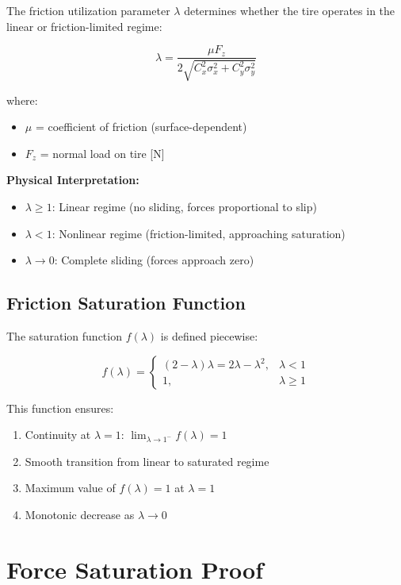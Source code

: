 \documentclass[11pt,a4paper]{article}
\begin{document}
The friction utilization parameter $\lambda$ determines whether the tire operates in the linear or friction-limited regime:

\begin{equation}
\lambda = \frac{\mu F_z}{2\sqrt{C_x^2 \sigma_x^2 + C_y^2 \sigma_y^2}}
\end{equation}

where:
\begin{itemize}
    \item $\mu$ = coefficient of friction (surface-dependent)
    \item $F_z$ = normal load on tire [N]
\end{itemize}

\textbf{Physical Interpretation:}
\begin{itemize}
    \item $\lambda \geq 1$: Linear regime (no sliding, forces proportional to slip)
    \item $\lambda < 1$: Nonlinear regime (friction-limited, approaching saturation)
    \item $\lambda \to 0$: Complete sliding (forces approach zero)
\end{itemize}

\subsection{Friction Saturation Function}

The saturation function $f(\lambda)$ is defined piecewise:

\begin{equation}
f(\lambda) = 
\begin{cases}
(2 - \lambda)\lambda = 2\lambda - \lambda^2, & \lambda < 1 \\
1, & \lambda \geq 1
\end{cases}
\end{equation}

This function ensures:
\begin{enumerate}
    \item Continuity at $\lambda = 1$: $\lim_{\lambda \to 1^-} f(\lambda) = 1$
    \item Smooth transition from linear to saturated regime
    \item Maximum value of $f(\lambda) = 1$ at $\lambda = 1$
    \item Monotonic decrease as $\lambda \to 0$
\end{enumerate}

\section{Force Saturation Proof}
\end{document}
